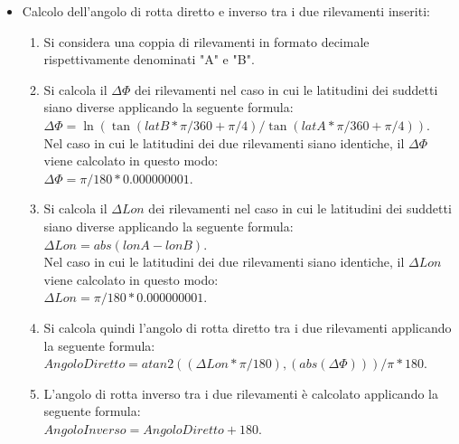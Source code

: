 \documentclass{article}
\begin{document}
\begin{itemize}
	\item  Calcolo dell'angolo di rotta diretto e inverso tra i due rilevamenti inseriti:
	\begin{enumerate}
		\item  Si considera una coppia di rilevamenti in formato decimale rispettivamente denominati "A" e "B".
		\item Si calcola il $\Delta\Phi$ dei rilevamenti nel caso in cui le latitudini dei suddetti siano diverse applicando la seguente formula:\\ $\Delta\Phi = \ln( \tan(latB * \pi / 360 + \pi / 4 ) / \tan(latA * \pi / 360 + \pi / 4 )). $\\
		Nel caso in cui le latitudini dei due rilevamenti siano identiche, il $\Delta\Phi$ viene calcolato in questo modo:\\ $\Delta\Phi = \pi / 180 * 0.000000001.$
		\item Si calcola il $\Delta Lon$ dei rilevamenti nel caso in cui le latitudini dei suddetti siano diverse applicando la seguente formula:\\ $ \Delta Lon = abs(lonA - lonB). $\\
		Nel caso in cui le latitudini dei due rilevamenti siano identiche, il $\Delta Lon$ viene calcolato in questo modo:\\ $\Delta Lon = \pi / 180 * 0.000000001.$
		\item Si calcola quindi l'angolo di rotta diretto tra i due rilevamenti applicando la seguente formula:\\ $ Angolo Diretto = atan2((\Delta Lon * \pi / 180), (abs(\Delta\Phi))) / \pi * 180.$\\
		\item L'angolo di rotta inverso tra i due rilevamenti è calcolato applicando la seguente formula: \\ $ Angolo Inverso = Angolo Diretto+ 180.$\\
	\end{enumerate}

\end{itemize}
\newpage
\end{document}
